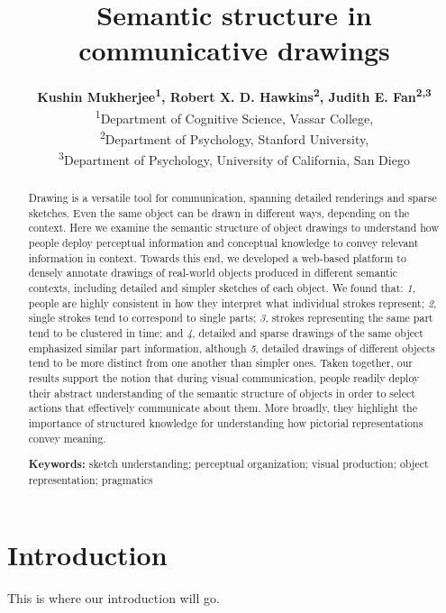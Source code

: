 \documentclass[10pt,letterpaper]{article}
\title{Semantic structure in communicative drawings}
\author{{\large \bf Kushin Mukherjee\textsuperscript{1}, Robert X. D. Hawkins\textsuperscript{2}, Judith E. Fan\textsuperscript{2,3}} \\
\textsuperscript{1}Department of Cognitive Science, Vassar College, \\
\textsuperscript{2}Department of Psychology, Stanford University, \\
\textsuperscript{3}Department of Psychology, University of California, San Diego}
\begin{document}
\maketitle 

\begin{abstract}
Drawing is a versatile tool for communication, spanning detailed renderings and sparse sketches. 
Even the same object can be drawn in different ways, depending on the context. 
Here we examine the semantic structure of object drawings to understand how people deploy perceptual information and conceptual knowledge to convey relevant information in context.
Towards this end, we developed a web-based platform to densely annotate drawings of real-world objects produced in different semantic contexts, including detailed and simpler sketches of each object. 
We found that: \textit{1}, people are highly consistent in how they interpret what individual strokes represent; \textit{2}, single strokes tend to correspond to single parts; \textit{3}, strokes representing the same part tend to be clustered in time; and \textit{4}, detailed and sparse drawings of the same object emphasized similar part information, although \textit{5}, detailed drawings of different objects tend to be more distinct from one another than simpler ones. 
Taken together, our results support the notion that during visual communication, people readily deploy their abstract understanding of the semantic structure of objects in order to select actions that effectively communicate about them. 
More broadly, they highlight the importance of structured knowledge for understanding how pictorial representations convey meaning. 



\textbf{Keywords:} 
sketch understanding; perceptual organization; visual production; object representation; pragmatics
\end{abstract}

\section{Introduction}
This is where our introduction will go.
\end{document}
